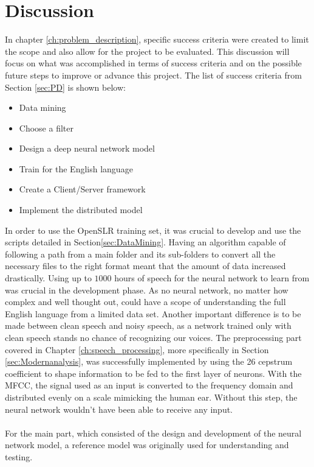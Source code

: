 \chapter{Discussion}\label{ch:discussion}
In chapter \ref{ch:problem_description},
specific success criteria were created to
limit the scope and also allow for the project to be 
evaluated. 
This discussion will focus on what was accomplished
in terms of success criteria and on the possible
future steps to improve or advance this project.
The list of success criteria from Section \ref{sec:PD} 
is shown below:
\begin{itemize}
    \item Data mining
    \item Choose a filter
    \item Design a deep neural network model
    \item Train for the English language
    \item Create a Client/Server framework
    \item Implement the distributed model
\end{itemize} 
In order to use the OpenSLR training set,
it was crucial to develop and use the scripts
detailed in Section\ref{sec:DataMining}.
Having an algorithm capable of following a path
from a main folder and its sub-folders to
convert all the necessary files to the right
format meant that the amount of data increased drastically.
Using up to $1000$ hours of speech for the neural
network to learn from was crucial in the development
phase.
As no neural network, no matter how complex and
well thought out, could have a scope of
understanding the full English language from a
limited data set. 
Another important difference is to be made between
clean speech and noisy speech, as a network
trained only with clean speech stands no chance
of recognizing our voices.
The preprocessing part covered in Chapter 
\ref{ch:speech_processing}, more specifically in Section 
\ref{sec:Modernanalysis}, was successfully implemented 
by using the 26 cepstrum coefficient to shape 
information to be fed to the first layer of neurons. 
With the MFCC, the signal used as an input is converted 
to the frequency domain and distributed evenly on a 
scale mimicking the human ear. Without this step, the 
neural network wouldn't have been able to
receive any input.\\\\
For the main part, which consisted of the design and 
development of the neural network model, a reference 
model was originally used for understanding and testing. 
